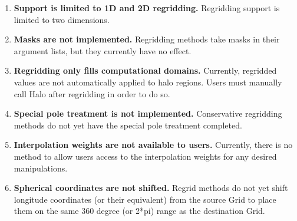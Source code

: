 

\begin{enumerate}

\item {\bf Support is limited to 1D and 2D regridding.}  Regridding
support is limited to two dimensions.

\item {\bf Masks are not implemented.}  Regridding methods take
masks in their argument lists, but they currently have no effect.

\item {\bf Regridding only fills computational domains.}  Currently,
regridded values are not automatically applied to halo regions.
Users must manually call Halo after regridding in order to do so.

\item {\bf Special pole treatment is not implemented.}
Conservative regridding methods do not yet have the special pole
treatment completed.

\item {\bf Interpolation weights are not available to users.}  
Currently, there is no method to allow users access to the interpolation
weights for any desired manipulations.

\item {\bf Spherical coordinates are not shifted.}
 Regrid methods do not yet shift longitude coordinates
(or their equivalent) from the source Grid to place them on the same
360 degree (or 2*pi) range as the destination Grid. 


\end{enumerate}
